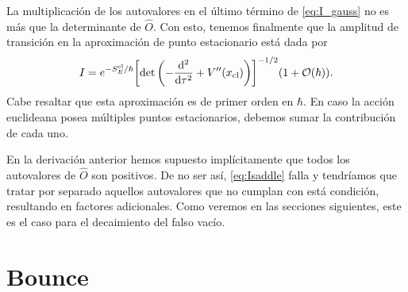 La multiplicación de los autovalores en el último término de \eqref{eq:I_gauss} no es más que la determinante de $\hat{O}$. Con esto, tenemos finalmente que la amplitud de transición en la aproximación de punto estacionario está dada por
\begin{equation}\label{eq:Isaddle}
I = e^{-S_E^{\textrm{cl}} / \hbar} \qty[ \det\left(-\dv[2]{\tau} + V''\qty(x_{\textrm{cl}}) \right) ]^{-1/2} \qty(1 + \order{\hbar}).
\end{equation}
Cabe resaltar que esta aproximación es de primer orden en $\hbar$. En caso la acción euclideana posea múltiples puntos estacionarios, debemos sumar la contribución de cada uno.


En la derivación anterior hemos supuesto implícitamente que todos los autovalores de $\hat{O}$ son positivos. De no ser así, \eqref{eq:Isaddle} falla y tendríamos que tratar por separado aquellos autovalores que no cumplan con está condición, resultando en factores adicionales. %
Como veremos en las secciones siguientes, este es el caso para el decaimiento del falso vacío.

\section{Bounce}


 

